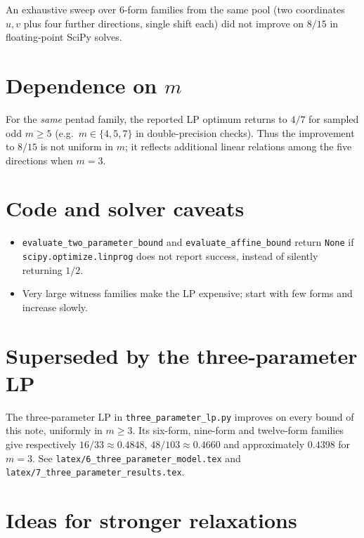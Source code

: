 \documentclass[11pt]{article}
\begin{document}
An exhaustive sweep over $6$-form families from the same pool (two coordinates
$u,v$ plus four further directions, single shift each) did not improve on $8/15$
in floating-point SciPy solves.

\section{Dependence on $m$}

For the \emph{same} pentad family, the reported LP optimum returns to $4/7$ for
sampled odd $m\ge 5$ (e.g.\ $m\in\{4,5,7\}$ in double-precision checks). Thus the
improvement to $8/15$ is not uniform in $m$; it reflects additional linear
relations among the five directions when $m=3$.

\section{Code and solver caveats}

\begin{itemize}
\item \texttt{evaluate\_two\_parameter\_bound} and \texttt{evaluate\_affine\_bound}
return \texttt{None} if \texttt{scipy.optimize.linprog} does not report success,
instead of silently returning $1/2$.
\item Very large witness families make the LP expensive; start with few forms and
increase slowly.
\end{itemize}

\section{Superseded by the three-parameter LP}

The three-parameter LP in \texttt{three\_parameter\_lp.py} improves on every
bound of this note, uniformly in $m\ge 3$. Its six-form, nine-form and
twelve-form families give respectively $16/33\approx 0.4848$,
$48/103\approx 0.4660$ and approximately $0.4398$ for $m=3$. See
\texttt{latex/6\_three\_parameter\_model.tex} and
\texttt{latex/7\_three\_parameter\_results.tex}.

\section{Ideas for stronger relaxations}
\end{document}
